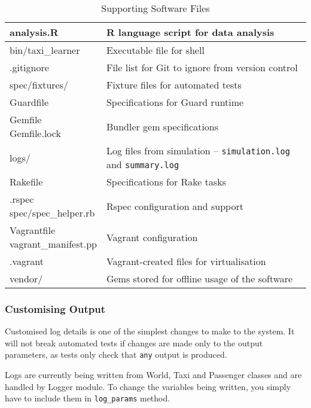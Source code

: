 \begin{table}
\begin{tabular}{| p{} | p{} |}
  \hline
  analysis.R & R language script for data analysis \\ \hline
  bin/taxi\_learner & Executable file for shell \\ \hline
  .gitignore & File list for Git to ignore from version control \\ \hline
  spec/fixtures/ & Fixture files for automated tests \\ \hline
  Guardfile & Specifications for Guard runtime \\ \hline
  \specialcell{Gemfile \\ Gemfile.lock} & Bundler gem specifications \\ \hline
  logs/ & Log files from simulation -- \texttt{simulation.log} and \texttt{summary.log} \\ \hline
  Rakefile & Specifications for Rake tasks \\ \hline
  \specialcell{.rspec \\ spec/spec\_helper.rb}  & Rspec configuration and support \\ \hline
  \specialcell{Vagrantfile \\ vagrant\_manifest.pp} & Vagrant configuration \\ \hline
  .vagrant & Vagrant-created files for virtualisation \\ \hline
  vendor/ & Gems stored for offline usage of the software \\ \hline
\end{tabular}
\caption{
  Supporting Software Files
  \label{table:software:support}
}
\end{table}


\subsubsection{Customising Output}
\label{sec:maintenance_manual:customising_output}

Customised log details is one of the simplest changes to make to the system. It
will not break automated tests if changes are made only to the output
parameters, as tests only check that \texttt{any} output is produced.

Logs are currently being written from World, Taxi and Passenger classes and are
handled by Logger module. To change the variables being written, you simply
have to include them in \texttt{log\_params} method.

